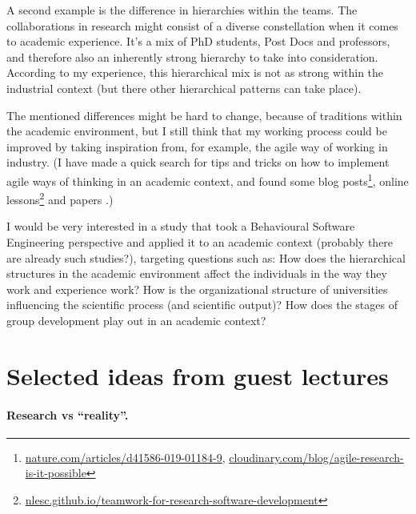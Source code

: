\documentclass[11pt]{article}
\begin{document}
A second example is the difference in hierarchies within the teams. The collaborations in research might consist of a diverse constellation when it comes to academic experience. It's a mix of PhD students, Post Docs and professors, and therefore also an inherently strong hierarchy to take into consideration. 
According to my experience, this hierarchical mix is not as strong within the industrial context (but there other hierarchical patterns can take place).

The mentioned differences might be hard to change, because of traditions within the academic environment, but I still think that 
my working process could be improved by taking inspiration from, for example, the agile way of working in industry. (I have made a quick search for tips and tricks on how to implement agile ways of thinking in an academic context, and found some blog posts\footnote{\hyperlink{https://www.nature.com/articles/d41586-019-01184-9}{nature.com/articles/d41586-019-01184-9}, 
\hyperlink{https://cloudinary.com/blog/agile-research-is-it-possible}{cloudinary.com/blog/agile-research-is-it-possible}}, 
online lessons\footnote{\hyperlink{https://nlesc.github.io/teamwork-for-research-software-development/}{nlesc.github.io/teamwork-for-research-software-development}} 
and papers \cite{biely_agile_2024} \cite{senabre2018management}.)

I would be very interested in a study that took a Behavioural Software Engineering perspective and applied it to an academic context (probably there are already such studies?), targeting questions such as:
How does the hierarchical structures in the academic environment affect the individuals in the way they work and experience work? 
How is the organizational structure of universities influencing the scientific process (and scientific output)?
How does the stages of group development play out in an academic context? 



\section{Selected ideas from guest lectures}

\paragraph*{Research vs ``reality''.}
\end{document}
